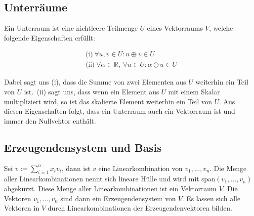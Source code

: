 \subsection{Unterräume}

Ein Unterraum ist eine nichtleere Teilmenge \( U \) eines Vektorraums \( V \), welche folgende Eigenschaften erfüllt:

\begin{equation*}
    \begin{aligned}
        &\text{(i)} \ \forall u, v \in U: u \oplus v \in U \\
        &\text{(ii)} \ \forall \alpha \in \mathbb{R}, \ \forall u \in U: \alpha \odot u \in U
    \end{aligned}
\end{equation*}

Dabei sagt uns (i), dass die Summe von zwei Elementen aus \( U \) weiterhin ein Teil von \( U \) ist.\ (ii) sagt uns, dass wenn ein Element aus \( U \) mit einem Skalar multipliziert wird, so ist das skalierte Element weiterhin ein Teil von \( U \). Aus diesen Eigenschaften folgt, dass ein Unterraum auch ein Vektorraum ist und immer den Nullvektor enthält.

\subsection{Erzeugendensystem und Basis}

Sei \( v:= \sum_{i=1}^{n}x_i v_i \), dann ist \( v \) eine Linearkombination von \( v_1, \dots, v_n \). Die Menge aller Linearkombinationen nennt sich lineare Hülle und wird mit span\( (v_1, \dots, v_n) \) abgekürzt. Diese Menge aller Linearkombinationen ist ein Vektorraum \( V\). Die Vektoren \( v_1, \dots, v_n \)  sind dann ein Erzeugendensystem von \( V \). Es lassen sich alle Vektoren in \( V \) durch Linearkombinationen der Erzeugendenvektoren bilden. 

